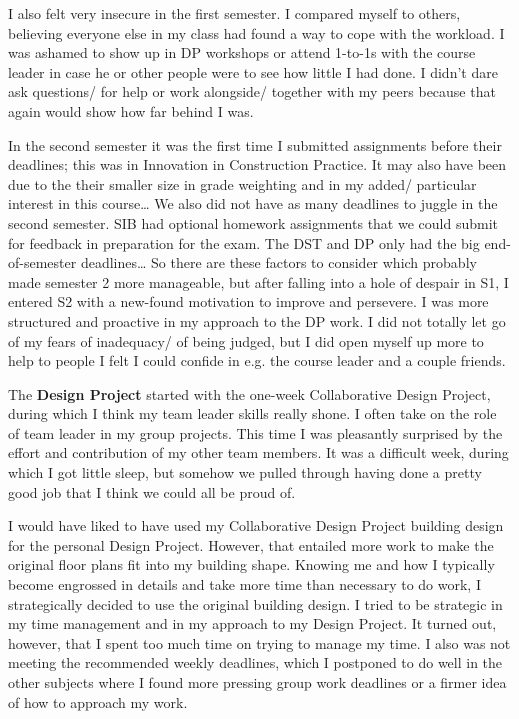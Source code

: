 I also felt very insecure in the first semester.
I compared myself to others, believing everyone else in my class had found a way to cope with the workload.
I was ashamed to show up in DP workshops or attend 1-to-1s with the course leader in case he or other people were to see how little I had done.
I didn't dare ask questions/ for help or work alongside/ together with my peers because that again would show how far behind I was.

In the second semester it was the first time I submitted assignments before their deadlines; this was in Innovation in Construction Practice.
It may also have been due to the their smaller size in grade weighting and in my added/ particular interest in this course…
We also did not have as many deadlines to juggle in the second semester.
SIB had optional homework assignments that we could submit for feedback in preparation for the exam.
The DST and DP only had the big end-of-semester deadlines…
So there are these factors to consider which probably made semester 2 more manageable, but after falling into a hole of despair in S1, I entered S2 with a new-found motivation to improve and persevere.
I was more structured and proactive in my approach to the DP work.
I did not totally let go of my fears of inadequacy/ of being judged, but I did open myself up more to help to people I felt I could confide in e.g. the course leader and a couple friends.

The \textbf{Design Project} started with the one-week Collaborative Design Project, during which I think my team leader skills really shone.
I often take on the role of team leader in my group projects.
This time I was pleasantly surprised by the effort and contribution of my other team members.
It was a difficult week, during which I got little sleep, but somehow we pulled through having done a pretty good job that I think we could all be proud of.

I would have liked to have used my Collaborative Design Project building design for the personal Design Project.
However, that entailed more work to make the original floor plans fit into my building shape.
Knowing me and how I typically become engrossed in details and take more time than necessary to do work, I strategically decided to use the original building design.
I tried to be strategic in my time management and in my approach to my Design Project.
It turned out, however, that I spent too much time on trying to manage my time.
I also was not meeting the recommended weekly deadlines, which I postponed to do well in the other subjects where I found more pressing group work deadlines or a firmer idea of how to approach my work.

